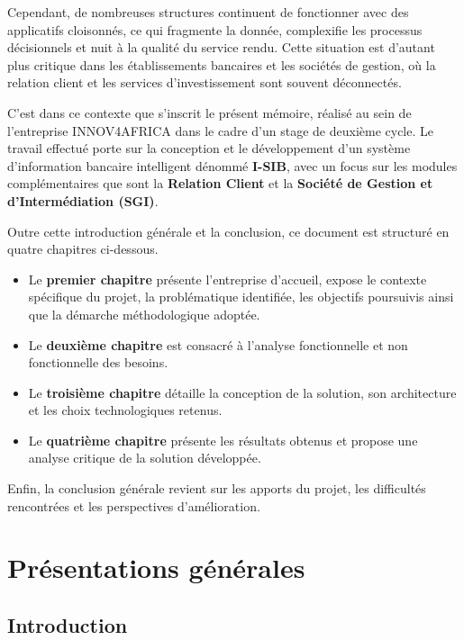 \documentclass[a4paper,12pt]{report}
\begin{document}
Cependant, de nombreuses structures continuent de fonctionner avec des applicatifs cloisonnés, ce qui fragmente la donnée, complexifie les processus décisionnels et nuit à la qualité du service rendu. Cette situation est d'autant plus critique dans les établissements bancaires et les sociétés de gestion, où la relation client et les services d'investissement sont souvent déconnectés.

C'est dans ce contexte que s'inscrit le présent mémoire, réalisé au sein de l'entreprise INNOV4AFRICA dans le cadre d'un stage de deuxième cycle. Le travail effectué porte sur la conception et le développement d'un système d'information bancaire intelligent dénommé \textbf{I-SIB}, avec un focus sur les modules complémentaires que sont la \textbf{Relation Client} et la \textbf{Société de Gestion et d'Intermédiation (SGI)}.



Outre cette introduction générale et la conclusion, ce document est structuré en
quatre chapitres ci-dessous.

\begin{itemize}
    \item Le \textbf{premier chapitre} présente l'entreprise d'accueil, expose le contexte spécifique du projet, la problématique identifiée, les objectifs poursuivis ainsi que la démarche méthodologique adoptée.
    \item Le \textbf{deuxième chapitre} est consacré à l'analyse fonctionnelle et non fonctionnelle des besoins.
    \item Le \textbf{troisième chapitre} détaille la conception de la solution, son architecture et les choix technologiques retenus.
    \item Le \textbf{quatrième chapitre} présente les résultats obtenus et propose une analyse critique de la solution développée.
\end{itemize}

Enfin, la conclusion générale revient sur les apports du projet, les difficultés rencontrées et les perspectives d'amélioration.

\chapter{Présentations générales}

\section*{Introduction}
{}
\end{document}
